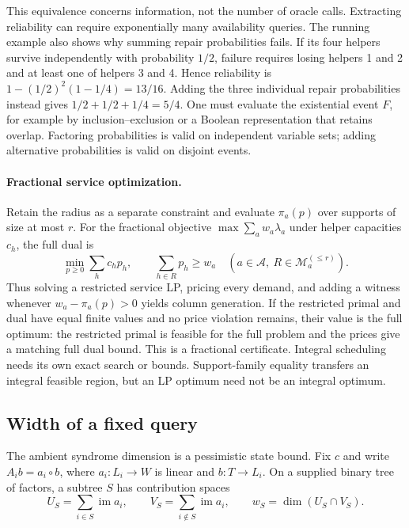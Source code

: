 This equivalence concerns information, not the number of oracle calls.
Extracting reliability can require exponentially many availability queries.
The running example also shows why summing repair probabilities fails.
If its four helpers survive independently with probability $1/2$, failure
requires losing helpers 1 and 2 and at least one of helpers 3 and 4.  Hence
reliability is $1-(1/2)^2(1-1/4)=13/16$.  Adding the three individual
repair probabilities instead gives $1/2+1/2+1/4=5/4$.
One must evaluate the existential event $F$,
for example by inclusion--exclusion or a Boolean representation that retains
overlap.  Factoring probabilities is valid on independent variable sets;
adding alternative probabilities is valid on disjoint events.

\paragraph{Fractional service optimization.}
Retain the radius as a separate constraint and
evaluate $\pi_a(p)$ over supports of size at most $r$.
For the fractional objective $\max\sum_a w_a\lambda_a$ under helper
capacities $c_h$, the full dual is
\[
 \min_{p\geq0}\sum_h c_hp_h,
 \qquad \sum_{h\in R}p_h\geq w_a
       \quad(a\in\mathcal A,\ R\in\mathcal M_a^{(\leq r)}).
\]
Thus solving a restricted service LP, pricing every demand, and adding a
witness whenever $w_a-\pi_a(p)>0$ yields column generation.  If the
restricted primal and dual have equal finite values and no price violation
remains, their value is the full optimum: the restricted primal is feasible
for the full problem and the prices give a matching full dual bound.
This is a fractional certificate.  Integral scheduling needs its own exact
search or bounds.  Support-family equality transfers an integral feasible
region, but an LP optimum need not be an integral optimum.

\subsection{Width of a fixed query}

The ambient syndrome dimension is a pessimistic state bound.  Fix $c$ and
write $A_i b=a_i\circ b$, where $a_i:L_i\to W$ is linear and
$b:T\to L_i$.  On a supplied binary tree of factors, a subtree $S$ has
contribution spaces
\[
 U_S=\sum_{i\in S}\operatorname{im}a_i,\qquad
 V_S=\sum_{i\notin S}\operatorname{im}a_i,\qquad
 w_S=\dim(U_S\cap V_S).
\]

